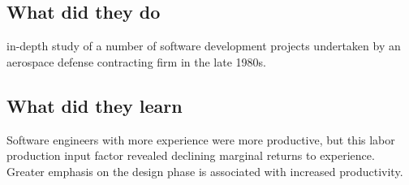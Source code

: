 \subsection{What did they do}

in-depth study of a number of software development projects undertaken by an aerospace defense contracting firm in the late 1980s.

\subsection{What did they learn}

Software engineers with more experience were more productive, but this labor production input factor revealed declining marginal returns to experience. Greater emphasis on the design phase is associated with increased productivity.
